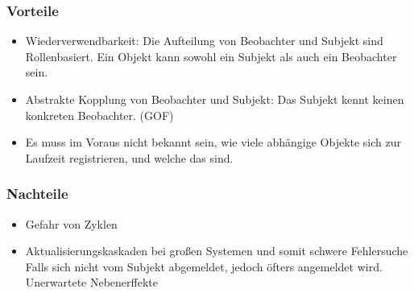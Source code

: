 \subsubsection{Vorteile}
\begin{itemize}
\item Wiederverwendbarkeit: Die Aufteilung von Beobachter und Subjekt sind Rollenbasiert. Ein Objekt kann sowohl ein Subjekt als auch ein Beobachter sein.
\item Abstrakte Kopplung von Beobachter und Subjekt: Das Subjekt kennt keinen konkreten Beobachter. (GOF) 
\item Es muss im Voraus nicht bekannt sein, wie viele abhängige Objekte sich zur Laufzeit registrieren, und welche das sind.
\end{itemize}
\subsubsection{Nachteile}
\begin{itemize}
\item Gefahr von Zyklen
\item Aktualisierungskaskaden bei großen Systemen und somit schwere Fehlersuche
Falls sich nicht vom Subjekt abgemeldet, jedoch öfters angemeldet wird. Unerwartete Nebenerffekte
\end{itemize}
